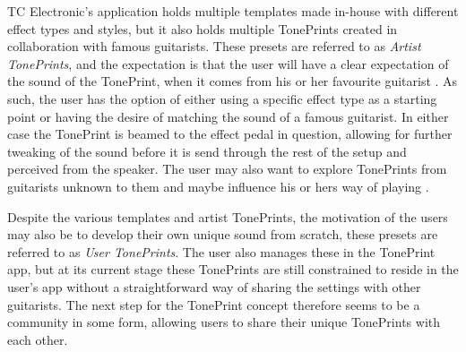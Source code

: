 TC Electronic's application holds multiple templates made in-house with different effect types and styles, but it also holds multiple TonePrints created in collaboration with famous guitarists. These presets are referred to as \textit{Artist TonePrints}, and the expectation is that the user will have a clear expectation of the sound of the TonePrint, when it comes from his or her favourite guitarist \parencite[][8]{PDF:TonePrintAnalyse}. As such, the user has the option of either using a specific effect type as a starting point or having the desire of matching the sound of a famous guitarist. In either case the TonePrint is beamed to the effect pedal in question, allowing for further tweaking of the sound before it is send through the rest of the setup and perceived from the speaker. The user may also want to explore TonePrints from guitarists unknown to them and maybe influence his or hers way of playing \parencite[][8]{PDF:TonePrintAnalyse}.

Despite the various templates and artist TonePrints, the motivation of the users may also be to develop their own unique sound from scratch, these presets are referred to as \textit{User TonePrints}. The user also manages these in the TonePrint app, but at its current stage these TonePrints are still constrained to reside in the user's app without a straightforward way of sharing the settings with other guitarists. The next step for the TonePrint concept therefore seems to be a community in some form, allowing users to share their unique TonePrints with each other.





